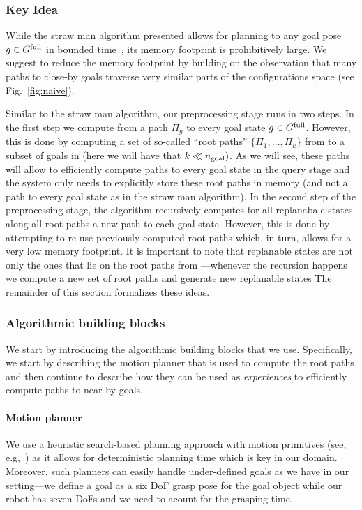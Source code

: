 \documentclass[a4paper,10pt]{article}
\begin{document}
\subsubsection{Key Idea}
While the straw man algorithm presented  allows for planning to any goal pose $ g \in G^{\textrm{full}}$ in bounded time~\Tbound, its memory footprint is prohibitively large.
%
We suggest to reduce the memory footprint by building on the observation that many paths to close-by goals traverse very similar parts of the configurations space (see Fig.~\ref{fig:naive}).

Similar to the straw man algorithm, our preprocessing stage runs in two steps.
In the first step we  compute from \Shome a path $\Pi_g$ to every goal state $ g \in G^{\textrm{full}}$. However, this is done by computing a set of so-called ``root paths'' $\{\Pi_1, \ldots, \Pi_k \}$ from \Shome to a subset of goals in \Gfull (here we will have that $k \ll n_{\rm goal})$. 
As we will see, these paths will allow to efficiently compute paths to every goal state in the query stage and the system only needs to explicitly store these root paths in memory (and not a path to every goal state as in the straw man algorithm).
%
In the second step of the preprocessing stage, the algorithm recursively computes for all replanabale states along all root paths a new path to each goal state. However, this is done by attempting to re-use previously-computed root paths which, in turn, allows for a very low memory footprint.
%
It is important to note that replanable states are not only the ones that lie on the root paths from \Shome---whenever the recursion happens we compute a new set of root paths and generate new replanable states
%
The remainder of this section formalizes these ideas.

\subsubsection{Algorithmic building blocks}
We start by introducing the algorithmic building blocks that we use.
Specifically, we start by describing the motion planner that is used to compute the root paths 
and then continue to describe how they can be used as \emph{experiences} to efficiently compute paths to near-by goals.

\paragraph{Motion planner}
We use a heuristic search-based planning approach with motion primitives (see, e.g,~\cite{CCL10,CSCL11,LF09})
as it allows for deterministic planning time which is key in our domain.
Moreover, such planners can easily handle under-defined goals as we have in our setting---we define a goal as a six DoF grasp pose for the goal object while our robot has seven DoFs and we need to acount for the grasping time.
\end{document}
